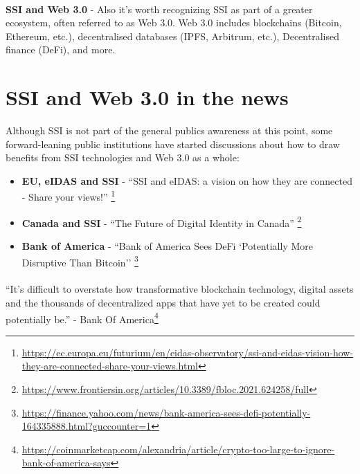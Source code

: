 \paragraph{}

\textbf{SSI and Web 3.0} - Also it's worth recognizing SSI as part of a greater ecosystem, often referred to as Web 3.0. Web 3.0 includes blockchains (Bitcoin, Ethereum, etc.), decentralised databases (IPFS, Arbitrum, etc.), Decentralised finance (DeFi), and more.




\pagebreak




\hypertarget{ssi-and-web-3.0-in-the-news}{%
\section{SSI and Web 3.0 in the
news}\label{ssi-and-web-3.0-in-the-news}}

Although SSI is not part of the general publics awareness at this point,
some forward-leaning public institutions have started discussions about
how to draw benefits from SSI technologies and Web 3.0 as a whole:

\begin{itemize}
\tightlist
\item
    \textbf{EU, eIDAS and SSI} - ``SSI and eIDAS: a vision on how they are connected - Share your views!'' \footnote{\url{https://ec.europa.eu/futurium/en/eidas-observatory/ssi-and-eidas-vision-how-they-are-connected-share-your-views.html}}
\item
    \textbf{Canada and SSI} - ``The Future of Digital Identity in Canada'' \footnote{\url{https://www.frontiersin.org/articles/10.3389/fbloc.2021.624258/full}}
\item
    \textbf{Bank of America} - ``Bank of America Sees DeFi `Potentially More Disruptive Than Bitcoin'' \footnote{\url{https://finance.yahoo.com/news/bank-america-sees-defi-potentially-164335888.html?guccounter=1}}
\end{itemize}

\paragraph{}

``It's difficult to overstate how transformative blockchain
technology, digital assets and the thousands of decentralized apps that
have yet to be created could potentially be.'' - Bank Of America\footnote{\url{https://coinmarketcap.com/alexandria/article/crypto-too-large-to-ignore-bank-of-america-says}}




